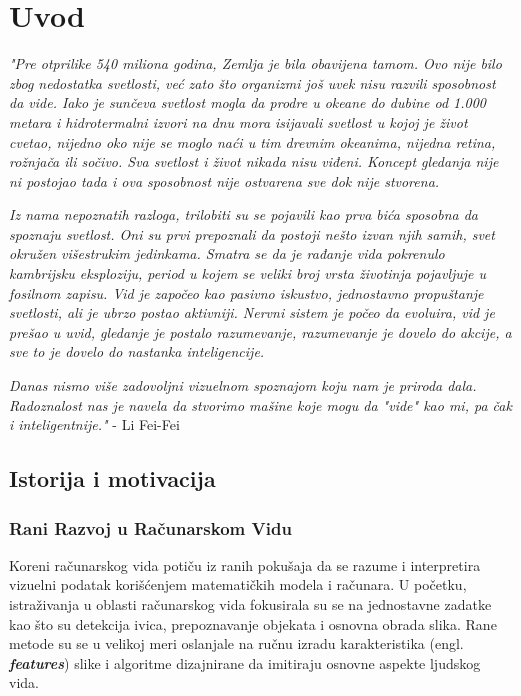 \documentclass[12pt]{article}
\begin{document}
   \section{Uvod}
   
   \textit{"Pre otprilike 540 miliona godina, 
   Zemlja je bila obavijena tamom.
   Ovo nije bilo zbog nedostatka svetlosti,
   već zato što organizmi još uvek nisu razvili sposobnost da vide.
   Iako je sunčeva svetlost mogla da prodre u okeane do dubine
   od 1.000 metara i hidrotermalni izvori na dnu mora isijavali 
   svetlost u kojoj je život cvetao, nijedno oko nije se moglo naći 
   u tim drevnim okeanima, nijedna retina, rožnjača ili sočivo. 
   Sva svetlost i život nikada nisu viđeni. Koncept gledanja nije ni postojao tada 
   i ova sposobnost nije ostvarena sve dok nije stvorena.
   }
   
   \textit{Iz nama nepoznatih razloga, trilobiti su se pojavili kao prva bića sposobna
   da spoznaju svetlost. Oni su prvi prepoznali da postoji nešto izvan
   njih samih, svet okružen višestrukim jedinkama. Smatra se da je rađanje vida pokrenulo
   kambrijsku eksploziju, period u kojem se veliki broj vrsta životinja pojavljuje u 
   fosilnom zapisu. Vid je započeo kao pasivno iskustvo, jednostavno propuštanje svetlosti, 
   ali je ubrzo postao aktivniji. Nervni sistem je počeo da evoluira, vid je prešao u uvid, 
   gledanje je postalo razumevanje, razumevanje je dovelo do akcije, a sve to je dovelo do 
   nastanka inteligencije.}
   
   \textit{Danas nismo više zadovoljni vizuelnom spoznajom koju nam je priroda dala. 
   Radoznalost nas je navela da stvorimo mašine koje mogu da "vide" kao mi, pa čak i inteligentnije."} - Li Fei-Fei \cite{li_fei_fei}
   

   \subsection{Istorija i motivacija}
   \vspace{-0.5cm}
   \subsubsection{Rani Razvoj u Računarskom Vidu}

   Koreni računarskog vida potiču iz ranih pokušaja da se razume 
   i interpretira vizuelni podatak korišćenjem matematičkih modela i računara. 
   U početku, istraživanja u oblasti računarskog vida fokusirala su se na 
   jednostavne zadatke kao što su detekcija ivica, prepoznavanje objekata i 
   osnovna obrada slika. Rane metode su se u velikoj meri oslanjale na ručnu 
   izradu karakteristika (engl. \textbf{\textit{features}}) slike i algoritme dizajnirane da imitiraju osnovne aspekte 
   ljudskog vida.
\end{document}
